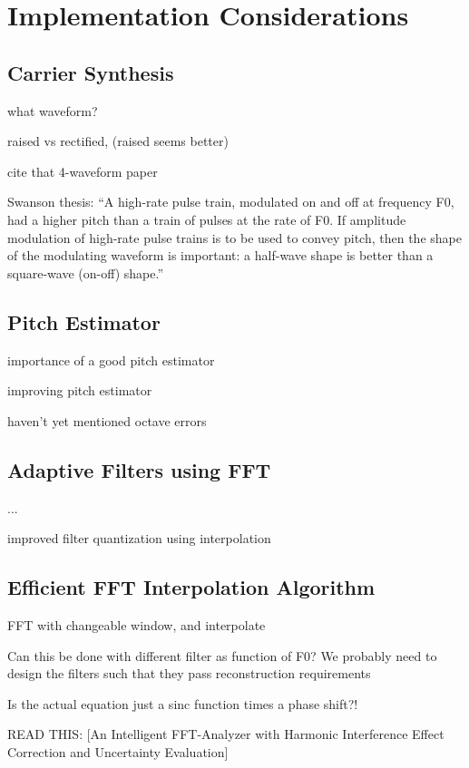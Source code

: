 \documentclass [11pt, proquest,oneside] {uwthesis}[2015/03/03]
\begin{document}
\section{Implementation Considerations}

\subsection{Carrier Synthesis}

what waveform?

raised vs rectified, (raised seems better)

cite that 4-waveform paper

Swanson thesis: ``A high-rate pulse train, modulated on and off at frequency F0, had a higher pitch than a train of pulses at the rate of F0. If amplitude modulation of high-rate pulse trains is to be used to convey pitch, then the shape of the modulating waveform is important: a half-wave shape is better than a square-wave (on-off) shape.''

\subsection{Pitch Estimator}

importance of a good pitch estimator

improving pitch estimator

haven't yet mentioned octave errors

\subsection{Adaptive Filters using FFT}

...

improved filter quantization using interpolation

\subsection{Efficient FFT Interpolation Algorithm}

FFT with changeable window, and interpolate

Can this be done with different filter as function of F0?
We probably need to design the filters such that they pass reconstruction requirements

Is the actual equation just a sinc function times a phase shift?!

READ THIS: [An Intelligent FFT-Analyzer with Harmonic Interference Effect Correction and Uncertainty Evaluation]
\end{document}
